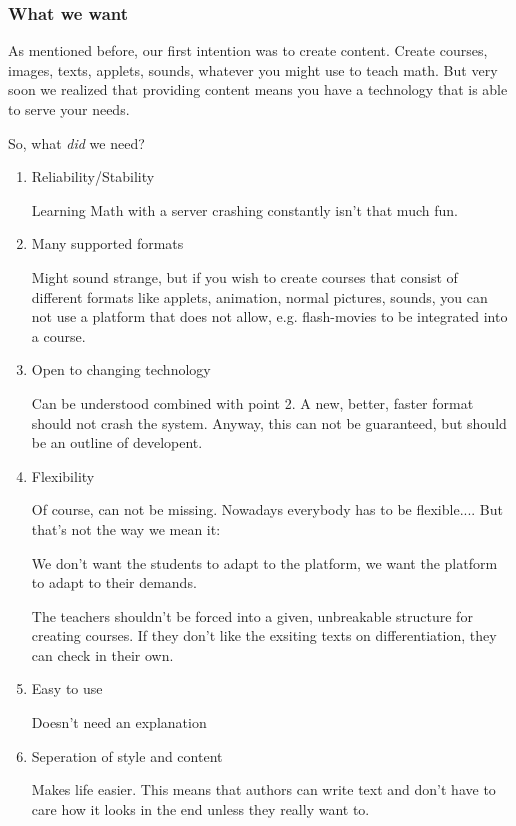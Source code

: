 \documentclass{webpage}
\begin{document}
\subsubsection{What we want}
As mentioned before, our first intention was to create content. Create courses, images, texts, applets,
sounds, whatever you might use to teach math. But very soon we realized that providing content
means you have a technology that is able to serve your needs. 

So, what \emph{ did} we need?
\begin{enumerate}
\item Reliability/Stability

Learning Math with a server crashing constantly isn't that much fun.
\item Many supported formats

Might sound strange, but if you wish to create courses that consist of different  
formats like applets, animation, normal pictures, sounds, you can not use a platform that does not
allow, e.g. flash-movies to be integrated into a course. 
\item Open to changing technology

Can be understood combined with point 2. A new, better, faster format should not crash the system.
Anyway, this  can not be guaranteed, but should be an outline of 
developent.
\item Flexibility

Of course, can not be missing.  Nowadays everybody has to be flexible.... 
But that's not the way we mean it:

We don't want the students to adapt to the platform, we want the platform to adapt to their demands.

The teachers shouldn't be forced into a given, unbreakable structure for creating courses. 
If they don't like the exsiting texts on differentiation, they can check in their own.
\item Easy to use

Doesn't need an explanation
\item Seperation of style and content

Makes life easier. This means that authors can write text and don't have to care how it looks in
the end unless they really want to. 
\end{enumerate}
\end{document}
